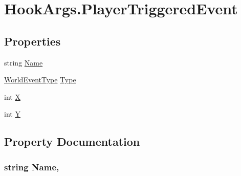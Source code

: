 \hypertarget{structOTA_1_1Plugin_1_1HookArgs_1_1PlayerTriggeredEvent}{}\section{Hook\+Args.\+Player\+Triggered\+Event}
\label{structOTA_1_1Plugin_1_1HookArgs_1_1PlayerTriggeredEvent}
\subsection*{Properties}
\begin{DoxyCompactItemize}
\item 
string \hyperlink{structOTA_1_1Plugin_1_1HookArgs_1_1PlayerTriggeredEvent_a7ee9065718e6628dc7791b756fa6c0f9}{Name}
\item 
\hyperlink{namespaceOTA_1_1Plugin_abfd87343e974fb3ed18f5915102f0217}{World\+Event\+Type} \hyperlink{structOTA_1_1Plugin_1_1HookArgs_1_1PlayerTriggeredEvent_a21295060ce882c0bfc4d1f34db3bfc01}{Type}
\item 
int \hyperlink{structOTA_1_1Plugin_1_1HookArgs_1_1PlayerTriggeredEvent_a80c0944640e62d3ed6c5419c1bcc0c88}{X}
\item 
int \hyperlink{structOTA_1_1Plugin_1_1HookArgs_1_1PlayerTriggeredEvent_aa482c4cc86a24474e4fb19b5b5978778}{Y}
\end{DoxyCompactItemize}


\subsection{Property Documentation}
\hypertarget{structOTA_1_1Plugin_1_1HookArgs_1_1PlayerTriggeredEvent_a7ee9065718e6628dc7791b756fa6c0f9}{}
\subsubsection[{Name}]{\setlength{\rightskip}{0pt plus 5cm}string Name\hspace{0.3cm}{\ttfamily [get]}, {\ttfamily [set]}}\label{structOTA_1_1Plugin_1_1HookArgs_1_1PlayerTriggeredEvent_a7ee9065718e6628dc7791b756fa6c0f9}
\hypertarget{structOTA_1_1Plugin_1_1HookArgs_1_1PlayerTriggeredEvent_a21295060ce882c0bfc4d1f34db3bfc01}{}
